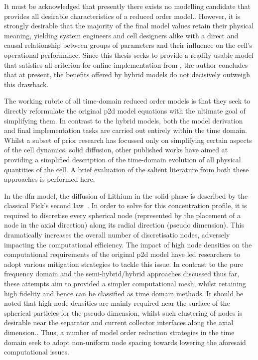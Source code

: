 It must be acknowledged that presently  there exists no modelling candidate that
provides  all desirable  characteristics of  a reduced  order model.. However,
it is  strongly desirable  that the  majority of the  final model  values retain
their physical meaning, yielding system  engineers and cell designers alike with
a  direct  and  causal  relationship  between groups  of  parameters  and  their
influence  on  the  cell's  operational performance.  Since  this  thesis  seeks
to  provide a  readily  usable  model that  satisfies  all   criterion  for online implementation  from ,  the author
concludes  that  at present,  the  benefits  offered  by  hybrid models  do  not
decisively outweigh this drawback.


The working rubric of all time-domain reduced  order models is that they seek to
directly reformulate  the original \gls{p2d}  model equations with  the ultimate
goal  of simplifying  them. In  contrast to  the hybrid  models, both  the model
derivation and  final implementation tasks  are carried out entirely  within the
time domain. Whilst a subset of  prior research has focussed only on simplifying
certain aspects  of the  cell dynamics, \eg{}  solid diffusion,  other published
works  have aimed  at  providing  a simplified  description  of the  time-domain
evolution of  all physical  quantities of  the cell. A  brief evaluation  of the
salient literature from both these approaches is performed here.


In the \gls{dfn} model, the diffusion of Lithium in the solid phase is described
by the classical  Fick's second law~\cite{Fick1995}. In order to  solve for this
concentration  profile,  it  is  required to  discretise  every  spherical  node
(represented by the placement of a node in the axial direction) along its radial
direction (pseudo dimension). This dramatically  increases the overall number of
discretisatio  nodes,  adversely  impacting the  computational  efficiency.  The
impact of high node densities on  the computational requirements of the original
\gls{p2d}  model have  led researchers  to adopt  various mitigation  strategies
to  tackle  this  issue. In  contrast  to  the  pure  frequency domain  and  the
semi-hybrid/hybrid approaches discussed thus far, these attempts aim to provided
a  simpler computational  mesh, whilst  retaining  high fidelity  and hence  can
be  classified  as time  domain  methods.  It should  be  noted  that high  node
densities are  mainly required near the  surface of the spherical  particles for
the  pseudo   dimension,  whilst  such  clustering of  nodes  is
desirable near  the separator and  current collector interfaces along  the axial
dimension..  Thus, a
number  of  model  order  reduction  strategies  in  the  time  domain  seek  to
adopt  non-uniform node  spacing  towards lowering  the aforesaid  computational
issues.


